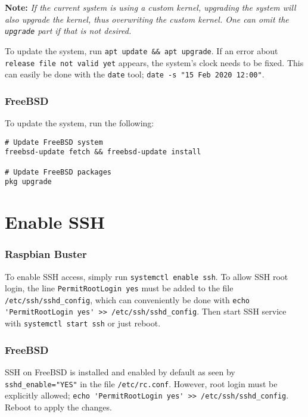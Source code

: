 \textbf{Note:} \textit{If the current system is using a custom kernel, upgrading the system will also upgrade the kernel, thus overwriting the custom kernel. One can omit the \lstinline{upgrade} part if that is not desired.}

To update the system, run \lstinline{apt update && apt upgrade}. If an error about \lstinline{release file not valid yet} appears, the system's clock needs to be fixed. This can easily be done with the \lstinline{date} tool; \lstinline{date -s "15 Feb 2020 12:00"}.

\subsubsection{FreeBSD}

To update the system, run the following:

\begin{verbatim}
# Update FreeBSD system
freebsd-update fetch && freebsd-update install

# Update FreeBSD packages
pkg upgrade
\end{verbatim}


\section{Enable SSH} \label{enable_ssh}

\subsubsection{Raspbian Buster}

To enable SSH access, simply run \lstinline{systemctl enable ssh}. To allow SSH root login, the line \lstinline{PermitRootLogin yes} must be added to the file \lstinline{/etc/ssh/sshd_config}, which can conveniently be done with \lstinline{echo 'PermitRootLogin yes' >> /etc/ssh/sshd_config}. Then start SSH service with \lstinline{systemctl start ssh} or just reboot.

\subsubsection{FreeBSD}

SSH on FreeBSD is installed and enabled by default as seen by \lstinline{sshd_enable="YES"} in the file \lstinline{/etc/rc.conf}. However, root login must be explicitly allowed; \lstinline{echo 'PermitRootLogin yes' >> /etc/ssh/sshd_config}. Reboot to apply the changes.

